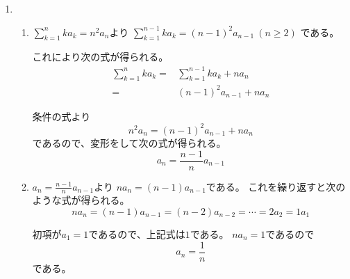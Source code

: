 \documentclass[12pt,b5paper]{ltjsarticle}
\begin{document}
\begin{enumerate}
\begin{enumerate}
              \dotfill

       \end{enumerate}

 \item %

       \begin{enumerate}
        \item %


              $\sum_{k=1}^n ka_k = n^2a_n$より
              $\sum_{k=1}^{n-1} ka_k = (n-1)^2a_{n-1} \ (n\geq 2)$
              である。

              これにより次の式が得られる。
              \begin{align}
               \sum_{k=1}^n ka_k =& \sum_{k=1}^{n-1} ka_k + na_n\\
               =& (n-1)^2a_{n-1} + na_n
              \end{align}

              条件の式より
              \begin{equation}
               n^2a_n = (n-1)^2a_{n-1} + na_n
              \end{equation}
              であるので、変形をして次の式が得られる。
              \begin{equation}
               a_n = \frac{n-1}{n}a_{n-1}
              \end{equation}

              \dotfill

        \item %

              $a_n = \frac{n-1}{n}a_{n-1}$より
              $na_n=(n-1)a_{n-1}$である。
              これを繰り返すと次のような式が得られる。
              \begin{equation}
               na_n=(n-1)a_{n-1}
                =(n-2)a_{n-2}
                = \cdots
                =2a_2 =1a_1
              \end{equation}

              初項が$a_1=1$であるので、上記式は$1$である。
              $na_n=1$であるので
              \begin{equation}
               a_n=\frac{1}{n}
              \end{equation}
              である。
       \end{enumerate}
\end{enumerate}

\hrulefill
\end{document}
